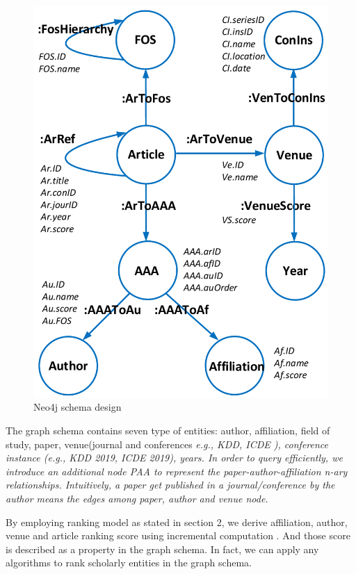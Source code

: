 \begin{figure}
\centering
\includegraphics[width=\columnwidth]{neo4jSchema.pdf}
\caption{Neo4j schema design}
\label{fig:schema}
\end{figure}

\par
The graph schema contains seven type of entities: author, affiliation, field of study, paper, venue(journal and conferences \itshape e.g., \upshape KDD, ICDE ), conference instance (\itshape e.g., \upshape KDD 2019, ICDE 2019), years. In order to query efficiently, we introduce an additional node PAA to represent the paper-author-affiliation n-ary relationships. Intuitively, a paper get published in a journal/conference by the author means the edges among paper, author and venue node. 

\par
By employing ranking model as stated in section 2, we derive affiliation, author, venue and article ranking score using incremental computation \cite{ma2018query}. And those score is described as a property in the graph schema. In fact, we can apply any algorithms to rank scholarly entities in the graph schema.


